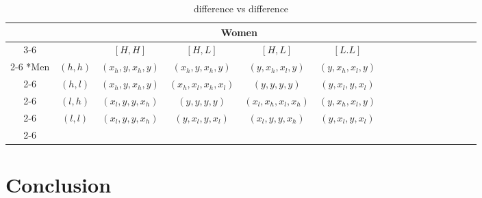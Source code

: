 \documentclass{article}
\begin{document}
	\begin{table}[h]
	\begin{center}
                \setlength{\extrarowheight}{2pt}
                \begin{tabular}{*{16}{c|}}
                  \multicolumn{2}{c}{} & \multicolumn{1}{c}{} & \multicolumn{2}{c}{Women}\\\cline{3-6}
                  \multicolumn{1}{c}{} &  & $[H, H]$  & $[H, L]$ & $[H, L]$ & $[L.L]$\\\cline{2-6}
                  \multirow{4}*{Men}  & $(h,h)$ & $(x_h,y,x_h,y)$ & $(x_h,y,x_h,y)$ & $(y,x_h,x_l,y)$ & $(y,x_h,x_l,y)$\\\cline{2-6}
                  & $(h,l)$ & $(x_h,y,x_h,y)$ & $(x_h,x_l,x_h,x_l)$ & $(y,y,y,y)$ & $(y,x_l,y,x_l)$\\\cline{2-6}
                  & $(l,h)$ & $(x_l,y,y,x_h)$ & $(y,y,y,y)$ & $(x_l,x_h,x_l,x_h)$ & $(y,x_h,x_l,y)$\\\cline{2-6}
                  & $(l,l)$ & $(x_l,y,y,x_h)$ & $(y,x_l,y,x_l)$ & $(x_l,y,y,x_h)$ & $(y,x_l,y,x_l)$\\\cline{2-6}
                \end{tabular}
        \end{center}
        \caption{difference vs difference}
  	\end{table}




\section{Conclusion}
\end{document}

